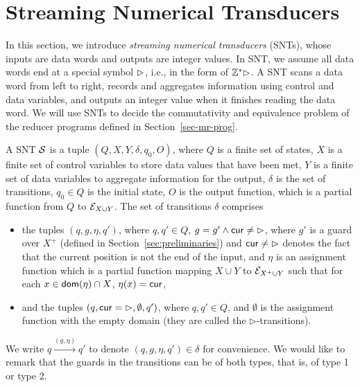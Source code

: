 


\section{Streaming Numerical Transducers}\label{sec:def-snt}

In this section, we introduce \emph{streaming numerical transducers} (SNTs), whose inputs are data words and outputs are integer values. 
In SNT, we assume all data words end at a special symbol $\rhd$, i.e., in the form of ${\mathbb{Z} }^*\rhd$.
A SNT scans a data word from left to right, records and aggregates information using control and data variables, and outputs an integer value when it finishes reading the data word. We will use SNTs to decide the commutativity and equivalence problem of the reducer programs defined in Section~\ref{sec-mr-prog}. 


A SNT ${\mathcal{S} }$ is a tuple $(Q, X, Y, \delta, q_0, O)$, where $Q$ is a finite set of states, $X$ is a finite set of control variables to store data values that have been met, $Y$ is a finite set of data variables to aggregate information for the output, $\delta$ is the set of transitions, $q_0 \in Q$ is the initial state, $O$ is the output function, which is a partial function from $Q$ to ${\mathcal{E} }_{X \cup Y}$.
The set of transitions $\delta$ comprises 
\begin{itemize}
\item the tuples $(q,  g, \eta, q')$, where $q,q'\in Q$, $g=g' \wedge \mathsf{cur} \neq \rhd$, where $g'$ is a guard over $X^+$ (defined in Section~\ref{sec:preliminaries}) and $\mathsf{cur} \neq \rhd$ denotes the fact that the current position is not the end of the input,  and $\eta$ is an assignment function which is a partial function mapping $X \cup Y$  to ${\mathcal{E} }_{X^+ \cup Y}$ such that for each $x \in \mathsf{dom}(\eta) \cap X$, $\eta(x)=\mathsf{cur}$,
%
\item and the tuples $(q, \mathsf{cur} = \rhd, \emptyset, q')$, where $q,q' \in Q$, and $\emptyset$ is the assignment function with the empty domain (they are called the $\triangleright$-transitions).
\end{itemize}
We write $q \xrightarrow{(g,\eta)} q'$ to denote $(q,g,\eta,q') \in \delta$ for convenience.  We would like to remark that the guards in the transitions can be of both types, that is, of type 1 or type 2.


